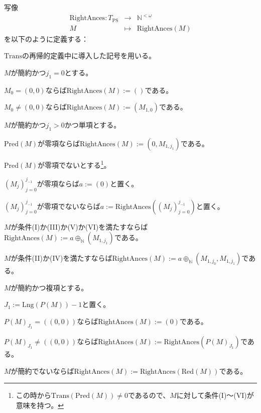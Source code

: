 \documentclass[dvipdfmx,uplatex]{jsarticle}
\theoremstyle{customnonumberbreakfortheorem}
\theoremstyle{customnonumberbreakforproof}
\begin{document}
写像
\begin{eqnarray*}
\textrm{RightAnces} \colon T_{\textrm{PS}} & \to & \mathbb{N}^{< \omega} \\
M & \mapsto & \textrm{RightAnces}(M)
\end{eqnarray*}
を以下のように定義する：
\begin{nenumerate}
	\item \(\textrm{Trans}\)の再帰的定義中に導入した記号を用いる。
	\item \(M\)が簡約かつ\(j_1 = 0\)とする。
	\begin{nenumerate}
		\item \(M_0 = (0,0)\)ならば\(\textrm{RightAnces}(M) := ()\)である。
		\item \(M_0 \neq (0,0)\)ならば\(\textrm{RightAnces}(M) := (M_{1,0})\)である。
	\end{nenumerate}
	\item \(M\)が簡約かつ\(j_1 > 0\)かつ単項とする。
	\begin{nenumerate}
		\item \(\textrm{Pred}(M)\)が零項ならば\(\textrm{RightAnces}(M) := (0,M_{1,j_1})\)である。
		\item \(\textrm{Pred}(M)\)が零項でないとする\footnote{この時から\(\textrm{Trans}(\textrm{Pred}(M)) \neq 0\)であるので、\(M\)に対して条件(I)～(VI)が意味を持つ。}。
		\begin{nenumerate}
			\item \((M_j)_{j=0}^{j_{-1}}\)が零項ならば\(a := (0)\)と置く。
			\item \((M_j)_{j=0}^{j_{-1}}\)が零項でないならば\(a := \textrm{RightAnces}((M_j)_{j=0}^{j_{-1}})\)と置く。
			\item \(M\)が条件(I)か(III)か(V)か(VI)を満たすならば\(\textrm{RightAnces}(M) := a \oplus_{\mathbb{N}} (M_{1,j_1})\)である。
			\item \(M\)が条件(II)か(IV)を満たすならば\(\textrm{RightAnces}(M) := a \oplus_{\mathbb{N}} (M_{1,j_0},M_{1,j_1})\)である。
		\end{nenumerate}
	\end{nenumerate}
	\item \(M\)が簡約かつ複項とする。
	\begin{nenumerate}
		\item \(J_1 := \textrm{Lng}(P(M))-1\)と置く。
		\item \(P(M)_{J_1} = ((0,0))\)ならば\(\textrm{RightAnces}(M) := (0)\)である。
		\item \(P(M)_{J_1} \neq ((0,0))\)ならば\(\textrm{RightAnces}(M) := \textrm{RightAnces}(P(M)_{J_1})\)である。
	\end{nenumerate}
	\item \(M\)が簡約でないならば\(\textrm{RightAnces}(M) := \textrm{RightAnces}(\textrm{Red}(M))\)である。
\end{nenumerate}
\end{document}
